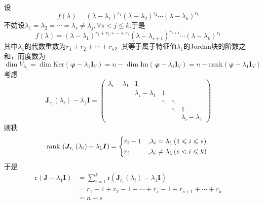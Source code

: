 设\[
    f\left(\lambda\right)=\left(\lambda-\lambda_1\right)^{r_1}\left(\lambda-\lambda_2\right)^{r_2}\cdots\left(\lambda-\lambda_k\right)^{r_k}
\]不妨设$\lambda_1=\lambda_2=\cdots=\lambda_s\neq \lambda_j,\forall s<j\leqslant k.$于是\[
    f\left(\lambda\right)=\left(\lambda-\lambda_1\right)^{r_1+r_2+\cdots+r_s}\left(\lambda-\lambda_{s+1}\right)^{r_{s+1}}\cdots\left(\lambda-\lambda_k\right)^{r_k}
\]其中$\lambda_1$的代数重数为$r_1+r_2+\cdots+r_s$，其等于属于特征值$\lambda_1$的Jordan块的阶数之和，而度数为\[
    \dim V_{\lambda_1}=\dim\mathrm{Ker}\left(
    \bm{\varphi}-\lambda_1\bm{I}_V
    \right)=n-\dim\mathrm{Im}\left(
    \bm{\varphi}-\lambda_1\bm{I}_V
    \right)=n-\mathrm{rank}\left(
    \bm{\varphi}-\lambda_1\bm{I}_V
    \right)
\]考虑\[\bm{J}_{r_i}\left(\lambda_i\right)-\lambda_1\bm{I}=
    \begin{pmatrix}
        \lambda_i-\lambda_1 & 1                   &        &        &                     \\
                            & \lambda_i-\lambda_1 & 1      &                              \\
                            &                     & \ddots & \ddots &                     \\
                            &                     &        & \ddots & 1                   \\
                            &                     &        &        & \lambda_i-\lambda_1
    \end{pmatrix}
\]则秩\[
    \mathrm{rank}\,\left(
    \bm{J}_{r_i}\left(\lambda_i\right)-\lambda_1\bm{I}
    \right)=\begin{cases*}
        r_i-1 & ,$\lambda_i=\lambda_1\left(1\leqslant i\leqslant s\right)$ \\
        r_i   & ,$\lambda_i\neq \lambda_1\left(s<i\leqslant k\right)$
    \end{cases*}
\]于是\begin{align*}
    \mathrm{r}\left(\bm{J}-\lambda_1\bm{I}\right) & =\sum_{i=1}^k\mathrm{r}\left(
    \bm{J}_{r_i}\left(\lambda_i\right)-\lambda_1\bm{I}
    \right)                                                                                      \\
                                                  & =r_1-1+r_2-1+\cdots+r_s-1+r_{s+1}+\cdots+r_k \\
                                                  & =n-s
\end{align*}
